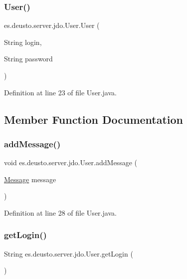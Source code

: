 \subsubsection{\texorpdfstring{User()}{User()}}
{\footnotesize\ttfamily es.\+deusto.\+server.\+jdo.\+User.\+User (\begin{DoxyParamCaption}\item[{String}]{login,  }\item[{String}]{password }\end{DoxyParamCaption})}



Definition at line 23 of file User.\+java.



\subsection{Member Function Documentation}
\mbox{\label{classes_1_1deusto_1_1server_1_1jdo_1_1_user_ad1e6a51cbfe6bfa62475b0789426ceb6}} 
\subsubsection{\texorpdfstring{addMessage()}{addMessage()}}
{\footnotesize\ttfamily void es.\+deusto.\+server.\+jdo.\+User.\+add\+Message (\begin{DoxyParamCaption}\item[{\mbox{\hyperlink{classes_1_1deusto_1_1server_1_1jdo_1_1_message}{Message}}}]{message }\end{DoxyParamCaption})}



Definition at line 28 of file User.\+java.

\mbox{\label{classes_1_1deusto_1_1server_1_1jdo_1_1_user_aad8107ea8f9281199377f705d541bf8e}} 
\subsubsection{\texorpdfstring{getLogin()}{getLogin()}}
{\footnotesize\ttfamily String es.\+deusto.\+server.\+jdo.\+User.\+get\+Login (\begin{DoxyParamCaption}{ }\end{DoxyParamCaption})}



